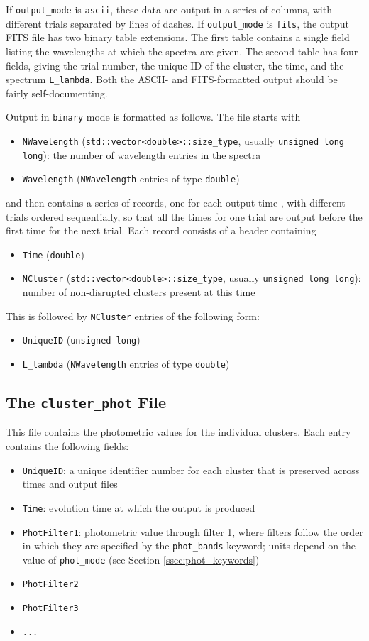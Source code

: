 \documentclass[12pt]{article}
\begin{document}
If \verb=output_mode= is \verb=ascii=, these data are output in a series of columns, with different trials separated by lines of dashes. If \verb=output_mode= is \verb=fits=, the output FITS file has two binary table extensions. The first table contains a single field listing the wavelengths at which the spectra are given. The second table has four fields, giving the trial number, the unique ID of the cluster, the time, and the spectrum \verb=L_lambda=. Both the ASCII- and FITS-formatted output should be fairly self-documenting.

Output in \verb=binary= mode is formatted as follows.  The file starts with
\begin{itemize}
\item \verb=NWavelength= (\verb=std::vector<double>::size_type=, usually \verb=unsigned long long=): the number of wavelength entries in the spectra
\item \verb=Wavelength= (\verb=NWavelength= entries of type \verb=double=)
\end{itemize}
and then contains a series of records, one for each output time , with different trials ordered sequentially, so that all the times for one trial are output before the first time for the next trial. Each record consists of a header containing
\begin{itemize}
\item \verb=Time= (\verb=double=)
\item \verb=NCluster= (\verb=std::vector<double>::size_type=, usually \verb=unsigned long long=): number of non-disrupted clusters present at this time
\end{itemize}
This is followed by \verb=NCluster= entries of the following form:
\begin{itemize}
\item \verb=UniqueID= (\verb=unsigned long=)
\item \verb=L_lambda= (\verb=NWavelength= entries of type \verb=double=)
\end{itemize}

\subsection{The \texttt{cluster\_phot} File}

This file contains the photometric values for the individual clusters. Each entry contains the following fields:
\begin{itemize}
\item \verb=UniqueID=: a unique identifier number for each cluster that is preserved across times and output files
\item \verb=Time=: evolution time at which the output is produced
\item \verb=PhotFilter1=: photometric value through filter 1, where filters follow the order in which they are specified by the \verb=phot_bands= keyword; units depend on the value of \verb=phot_mode= (see Section \ref{ssec:phot_keywords})
\item \verb=PhotFilter2=
\item \verb=PhotFilter3=
\item \verb=...=
\end{itemize}
\end{document}
